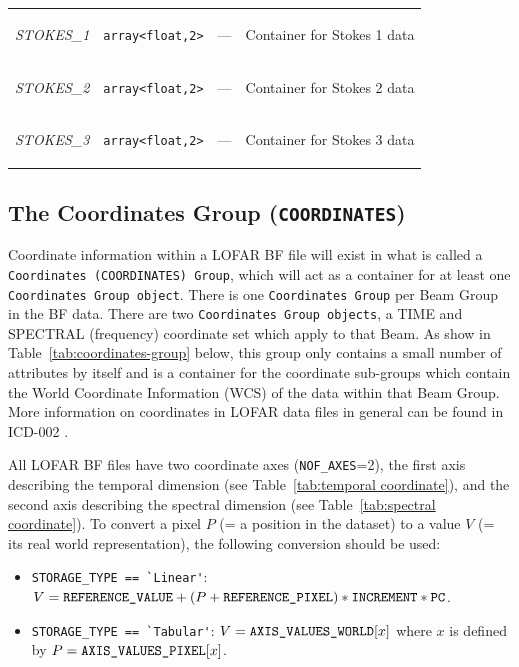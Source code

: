 \documentclass[a4paper,10pt,bibtotoc]{scrartcl}
\begin{document}
\begin{supertabular}{|lllp{5.5cm}|}
  \begin{scriptsize}\textit{STOKES\_1}\end{scriptsize}  & \verb|array<float,2>| & --- & Container for Stokes 1 data \\
  \begin{scriptsize}\textit{STOKES\_2}\end{scriptsize}  & \verb|array<float,2>| & --- & Container for Stokes 2 data \\
  \begin{scriptsize}\textit{STOKES\_3}\end{scriptsize}  & \verb|array<float,2>| & --- & Container for Stokes 3 data \\
  \hline
\end{supertabular}

\clearpage
\subsection{The Coordinates Group ({\tt COORDINATES})}
\label{sec:coordinates group}

Coordinate information within a LOFAR BF file will exist in what is
called a \texttt{Coordinates (COORDINATES) Group}, which will act as a
container for at least one \texttt{Coordinates Group object}.   There
is one \texttt{Coordinates Group} per Beam Group in the BF data.
There are two \texttt{Coordinates Group objects}, a TIME and SPECTRAL
(frequency) coordinate set which apply to that Beam.  As show in
Table~\ref{tab:coordinates-group} below, this group only contains a
small number of attributes by itself and is a container for the
coordinate sub-groups which contain the World Coordinate Information
(WCS) of the data within that Beam Group.  More information on coordinates
in LOFAR data files in general can be found in ICD-002 \cite{lofar.icd.002}. 




All LOFAR BF files have two coordinate axes (\verb|NOF_AXES|=2), the first axis describing the temporal dimension (see Table~\ref{tab:temporal coordinate}), and the second axis describing the spectral dimension (see Table~\ref{tab:spectral coordinate}). To convert a pixel $P$ (= a position in the dataset) to a value $V$ (= its real world representation), the following conversion should be used:
\begin{itemize}
\item \verb|STORAGE_TYPE == `Linear'|: $V = \verb|REFERENCE_VALUE| + (P + \verb|REFERENCE_PIXEL|) * \verb|INCREMENT| * \verb|PC|$.
\item \verb|STORAGE_TYPE == `Tabular'|: $V = \verb|AXIS_VALUES_WORLD|[x]$ where $x$ is defined by $P = \verb|AXIS_VALUES_PIXEL|[x]$.
\end{itemize}
\end{document}
